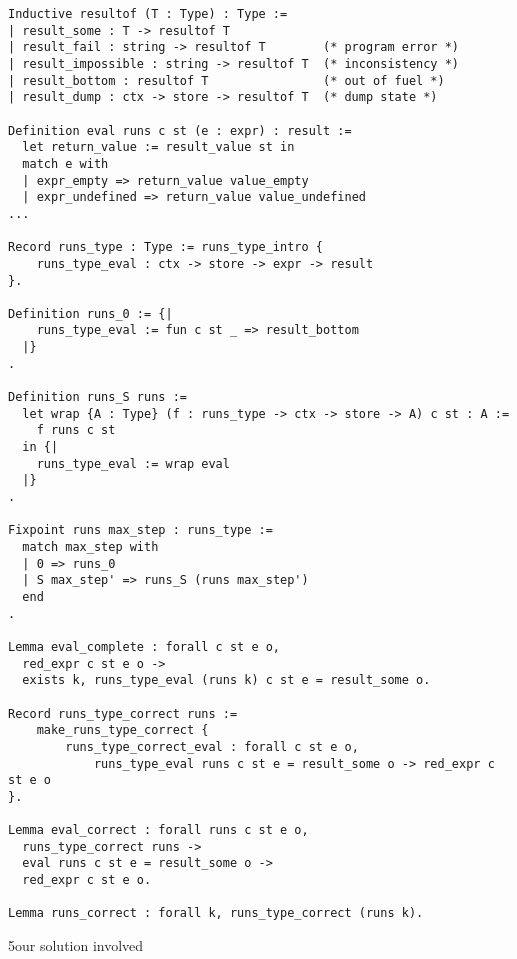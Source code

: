 \documentclass{llncs}
\newcommand{\asi}[1]{\todo[color=green,inline]{#1}}
\begin{document}
\begin{verbatim}
Inductive resultof (T : Type) : Type :=
| result_some : T -> resultof T
| result_fail : string -> resultof T        (* program error *)
| result_impossible : string -> resultof T  (* inconsistency *)
| result_bottom : resultof T                (* out of fuel *)
| result_dump : ctx -> store -> resultof T  (* dump state *)

Definition eval runs c st (e : expr) : result :=
  let return_value := result_value st in
  match e with
  | expr_empty => return_value value_empty
  | expr_undefined => return_value value_undefined
...

Record runs_type : Type := runs_type_intro {
    runs_type_eval : ctx -> store -> expr -> result
}.

Definition runs_0 := {|
    runs_type_eval := fun c st _ => result_bottom
  |}
.

Definition runs_S runs := 
  let wrap {A : Type} (f : runs_type -> ctx -> store -> A) c st : A :=
    f runs c st
  in {|
    runs_type_eval := wrap eval
  |}
.

Fixpoint runs max_step : runs_type :=
  match max_step with
  | 0 => runs_0
  | S max_step' => runs_S (runs max_step')
  end
.

Lemma eval_complete : forall c st e o,
  red_expr c st e o -> 
  exists k, runs_type_eval (runs k) c st e = result_some o.

Record runs_type_correct runs :=
    make_runs_type_correct {
        runs_type_correct_eval : forall c st e o,
            runs_type_eval runs c st e = result_some o -> red_expr c st e o
}.

Lemma eval_correct : forall runs c st e o,
  runs_type_correct runs -> 
  eval runs c st e = result_some o ->
  red_expr c st e o.

Lemma runs_correct : forall k, runs_type_correct (runs k). 
\end{verbatim}

\asi{Add the theorem.}

5our solution involved
\end{document}
